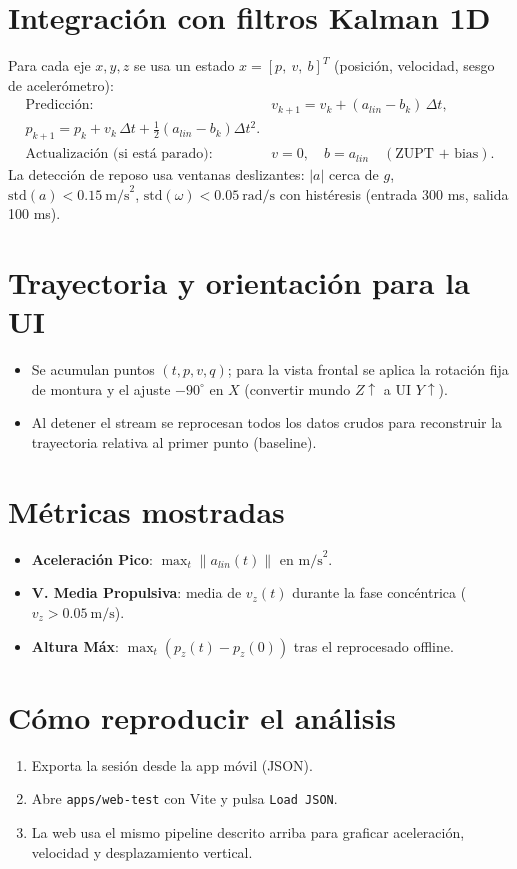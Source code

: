 \documentclass[11pt,a4paper]{article}
\begin{document}
\section{Integración con filtros Kalman 1D}
Para cada eje \(x,y,z\) se usa un estado \(x = [p,\ v,\ b]^T\) (posición, velocidad, sesgo de acelerómetro):
\begin{align*}
  \text{Predicción: } & 
  v_{k+1} = v_k + (a_{lin}-b_k)\,\Delta t,\\
  p_{k+1} = p_k + v_k\,\Delta t + \tfrac{1}{2}(a_{lin}-b_k)\Delta t^2.\\
  \text{Actualización (si está parado): } &
  v = 0,\quad b = a_{lin} \quad (\text{ZUPT + bias}).
\end{align*}
La detección de reposo usa ventanas deslizantes: \(|a|\) cerca de \(g\), \(\text{std}(a) < 0.15\ \text{m/s}^2\), \(\text{std}(\omega) < 0.05\ \text{rad/s}\) con histéresis (entrada 300 ms, salida 100 ms).

\section{Trayectoria y orientación para la UI}
\begin{itemize}[leftmargin=12pt]
  \item Se acumulan puntos \((t, p, v, q)\); para la vista frontal se aplica la rotación fija de montura y el ajuste \(-90^\circ\) en \(X\) (convertir mundo \(Z\uparrow\) a UI \(Y\uparrow\)).
  \item Al detener el stream se reprocesan todos los datos crudos para reconstruir la trayectoria relativa al primer punto (baseline).
\end{itemize}

\section{Métricas mostradas}
\begin{itemize}[leftmargin=12pt]
  \item \textbf{Aceleración Pico}: \(\max_t \|a_{lin}(t)\|\) en \(\text{m/s}^2\).
  \item \textbf{V. Media Propulsiva}: media de \(v_z(t)\) durante la fase concéntrica (\(v_z > 0.05\ \text{m/s}\)).
  \item \textbf{Altura Máx}: \(\max_t (p_z(t) - p_z(0))\) tras el reprocesado offline.
\end{itemize}

\section{Cómo reproducir el análisis}
\begin{enumerate}[leftmargin=14pt]
  \item Exporta la sesión desde la app móvil (JSON).
  \item Abre \texttt{apps/web-test} con Vite y pulsa \texttt{Load JSON}.
  \item La web usa el mismo pipeline descrito arriba para graficar aceleración, velocidad y desplazamiento vertical.
\end{enumerate}
\end{document}
